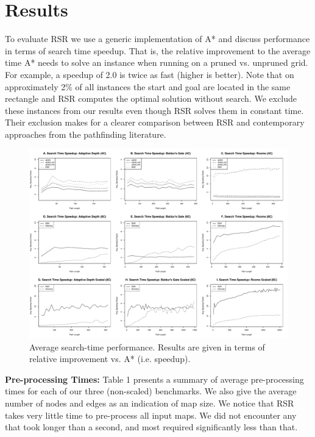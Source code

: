 \section{Results}
\label{cha::rsr::results}
To evaluate RSR we use a generic implementation of A* and discuss performance 
in terms of search time speedup. That is, the relative improvement to the average 
time A* needs to solve an instance when running on a pruned  vs. unpruned grid.
For example, a speedup of 2.0 is twice as fast (higher is better).
Note that on approximately 2\% of all instances the start and goal are located
in the same rectangle and RSR computes the optimal solution without
search.  We exclude these instances from our results even though RSR solves
them in constant time. 
Their exclusion makes for a clearer comparison between
RSR and contemporary approaches from the pathfinding literature.

\begin{figure}
\begin{center}
   \includegraphics[width=0.85\columnwidth, trim = 0mm 0mm 0mm 0mm]{chapter_rsr/diagrams/speedup.pdf}
\end{center}
\caption[Search time speedup: RSR]
{\small 
Average search-time performance. 
Results are given in terms of relative improvement vs. A* (i.e. speedup).}
\label{fig::rsr::speedup}
\end{figure}


\textbf{Pre-processing Times: } 
Table 1 presents a summary of average pre-processing times for
each of our three (non-scaled) benchmarks. We also give the average number of
nodes and edges as an indication of map size.
We notice that RSR takes very little time to pre-process all input maps. 
We did not encounter any that took longer than a second, and most required 
significantly less than that. 

